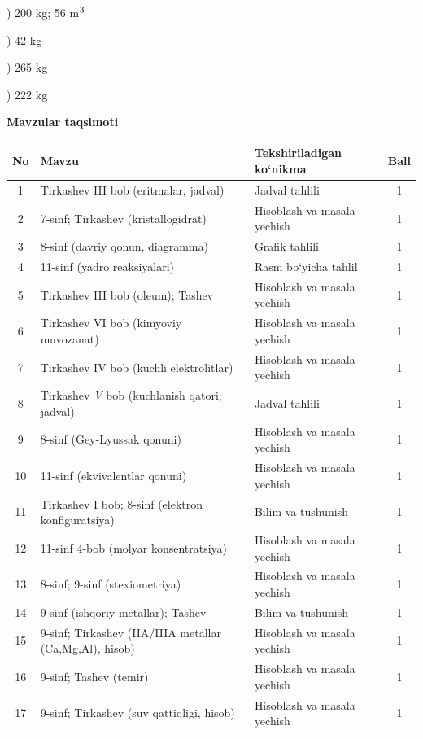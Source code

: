 \documentclass[11pt,a4paper]{article}
\renewcommand{\textsuperscript}[1]{\ensuremath{^{\text{\fontsize{8}{8}\selectfont #1}}}}
\begin{document}
) 200 kg; 56 m\textsuperscript{3}\par
{}) 42 kg\par
{}) 265 kg\par
{}) 222 kg\par
\par\bigskip\noindent\textbf{Mavzular taqsimoti}\par\smallskip
{\small\noindent\begin{longtable}{|c|p{7.2cm}|p{5.4cm}|c|}\hline \textbf{No} & \textbf{Mavzu} & \textbf{Tekshiriladigan ko`nikma} & \textbf{Ball}\\\hline
1 & Tirkashev III bob (eritmalar, jadval) & Jadval tahlili & 1\\\hline
2 & 7-sinf; Tirkashev (kristallogidrat) & Hisoblash va masala yechish & 1\\\hline
3 & 8-sinf (davriy qonun, diagramma) & Grafik tahlili & 1\\\hline
4 & 11-sinf (yadro reaksiyalari) & Rasm bo`yicha tahlil & 1\\\hline
5 & Tirkashev III bob (oleum); Tashev & Hisoblash va masala yechish & 1\\\hline
6 & Tirkashev VI bob (kimyoviy muvozanat) & Hisoblash va masala yechish & 1\\\hline
7 & Tirkashev IV bob (kuchli elektrolitlar) & Hisoblash va masala yechish & 1\\\hline
8 & Tirkashev \textit{V} bob (kuchlanish qatori, jadval) & Jadval tahlili & 1\\\hline
9 & 8-sinf (Gey-Lyussak qonuni) & Hisoblash va masala yechish & 1\\\hline
10 & 11-sinf (ekvivalentlar qonuni) & Hisoblash va masala yechish & 1\\\hline
11 & Tirkashev I bob; 8-sinf (elektron konfiguratsiya) & Bilim va tushunish & 1\\\hline
12 & 11-sinf 4-bob (molyar konsentratsiya) & Hisoblash va masala yechish & 1\\\hline
13 & 8-sinf; 9-sinf (stexiometriya) & Hisoblash va masala yechish & 1\\\hline
14 & 9-sinf (ishqoriy metallar); Tashev & Bilim va tushunish & 1\\\hline
15 & 9-sinf; Tirkashev (IIA/IIIA metallar (Ca,Mg,Al), hisob) & Hisoblash va masala yechish & 1\\\hline
16 & 9-sinf; Tashev (temir) & Hisoblash va masala yechish & 1\\\hline
17 & 9-sinf; Tirkashev (suv qattiqligi, hisob) & Hisoblash va masala yechish & 1\\\hline

\end{longtable}}
\end{document}
